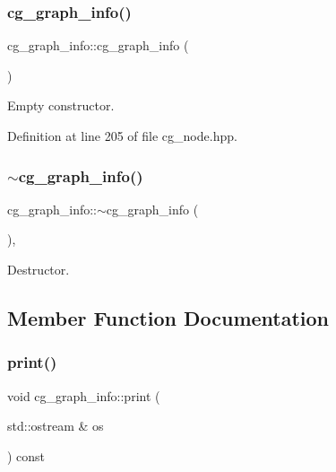 \subsubsection{\texorpdfstring{cg\+\_\+graph\+\_\+info()}{cg\_graph\_info()}\hspace{0.1cm}{\footnotesize\ttfamily [2/2]}}
{\footnotesize\ttfamily cg\+\_\+graph\+\_\+info\+::cg\+\_\+graph\+\_\+info (\begin{DoxyParamCaption}{ }\end{DoxyParamCaption})\hspace{0.3cm}{\ttfamily [inline]}}



Empty constructor. 



Definition at line 205 of file cg\+\_\+node.\+hpp.

\mbox{\label{structcg__graph__info_a371a32e8b7d0d131d0edb40a36df0df6}} 
\subsubsection{\texorpdfstring{$\sim$cg\+\_\+graph\+\_\+info()}{~cg\_graph\_info()}}
{\footnotesize\ttfamily cg\+\_\+graph\+\_\+info\+::$\sim$cg\+\_\+graph\+\_\+info (\begin{DoxyParamCaption}{ }\end{DoxyParamCaption})\hspace{0.3cm}{\ttfamily [override]}, {\ttfamily [default]}}



Destructor. 



\subsection{Member Function Documentation}
\mbox{\label{structcg__graph__info_a7a3f4560c6c6d6cbbb575dd666b8c598}} 
\subsubsection{\texorpdfstring{print()}{print()}}
{\footnotesize\ttfamily void cg\+\_\+graph\+\_\+info\+::print (\begin{DoxyParamCaption}\item[{std\+::ostream \&}]{os }\end{DoxyParamCaption}) const\hspace{0.3cm}{\ttfamily [inline]}}



